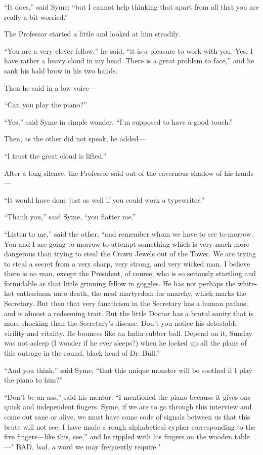 \documentclass{book}
\begin{document}
“It does,” said Syme; “but I cannot help thinking that apart from all that you are really a bit worried.”

The Professor started a little and looked at him steadily.

“You are a very clever fellow,” he said, “it is a pleasure to work with you. Yes, I have rather a heavy cloud in my head. There is a great problem to face,” and he sank his bald brow in his two hands.

Then he said in a low voice—

“Can you play the piano?”

“Yes,” said Syme in simple wonder, “I’m supposed to have a good touch.”

Then, as the other did not speak, he added—

“I trust the great cloud is lifted.”

After a long silence, the Professor said out of the cavernous shadow of his hands—

“It would have done just as well if you could work a typewriter.”

“Thank you,” said Syme, “you flatter me.”

“Listen to me,” said the other, “and remember whom we have to see to-morrow. You and I are going to-morrow to attempt something which is very much more dangerous than trying to steal the Crown Jewels out of the Tower. We are trying to steal a secret from a very sharp, very strong, and very wicked man. I believe there is no man, except the President, of course, who is so seriously startling and formidable as that little grinning fellow in goggles. He has not perhaps the white-hot enthusiasm unto death, the mad martyrdom for anarchy, which marks the Secretary. But then that very fanaticism in the Secretary has a human pathos, and is almost a redeeming trait. But the little Doctor has a brutal sanity that is more shocking than the Secretary’s disease. Don’t you notice his detestable virility and vitality. He bounces like an India-rubber ball. Depend on it, Sunday was not asleep (I wonder if he ever sleeps?) when he locked up all the plans of this outrage in the round, black head of Dr. Bull.”

“And you think,” said Syme, “that this unique monster will be soothed if I play the piano to him?”

“Don’t be an ass,” said his mentor. “I mentioned the piano because it gives one quick and independent fingers. Syme, if we are to go through this interview and come out sane or alive, we must have some code of signals between us that this brute will not see. I have made a rough alphabetical cypher corresponding to the five fingers—like this, see,” and he rippled with his fingers on the wooden table—" BAD, bad, a word we may frequently require."
\end{document}

